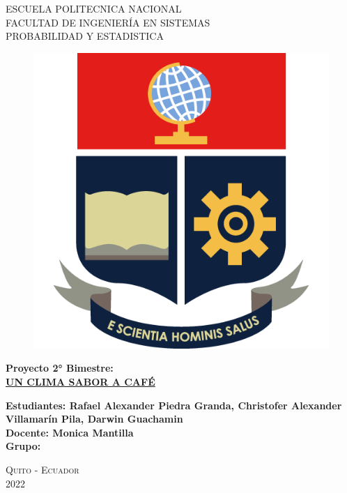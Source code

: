\documentclass{article}
\begin{document}
\begin{center} \LARGE{ESCUELA POLITECNICA NACIONAL} \\[0.5cm] \Large{FACULTAD DE INGENIERÍA EN SISTEMAS}\\[0.5cm] \large{PROBABILIDAD Y ESTADISTICA} \end{center}
\begin{figure}[htb] \centering \includegraphics[scale=.6]{descarga (1).png}\end{figure}
\begin{center} \large{\bf Proyecto 2° Bimestre:}\\ \vspace{.25cm} { \Large \bfseries \underline{UN CLIMA SABOR A CAFÉ}} \\ \end{center}
\large{\bf Estudiantes: Rafael Alexander Piedra Granda, Christofer Alexander Villamarín Pila, Darwin Guachamin  }\\
\large{\bf Docente: Monica Mantilla }\\
\large{\bf Grupo: }\\\begin{center} \Large \textsc{Quito - Ecuador} \\
\Large \textsc{2022}
\end{center}
\pagebreak
\end{document}
